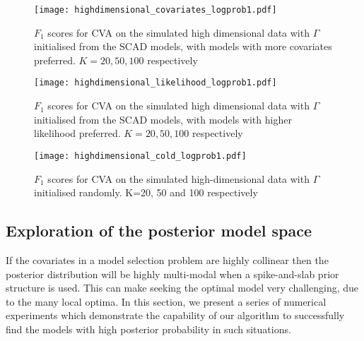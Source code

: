 \begin{figure}\label{fig:highdim_warm_start_covariates}
\caption{$F_1$ scores for CVA on the simulated high dimensional data with $\Gamma$ initialised from the SCAD models, with models with more covariates preferred. $K=20, 50, 100$ respectively}
\texttt{[image: highdimensional\_covariates\_logprob1.pdf]}
\end{figure}

\begin{figure}\label{fig:highdim_warm_start_likelihood}
\caption{$F_1$ scores for CVA on the simulated high dimensional data with $\Gamma$ initialised from the SCAD models, with models with higher likelihood preferred. $K=20, 50, 100$ respectively}
\texttt{[image: highdimensional\_likelihood\_logprob1.pdf]}
\end{figure}

\begin{figure}\label{fig:highdim_cold_start}
\caption{$F_1$ scores for CVA on the simulated high-dimensional data with $\Gamma$ initialised randomly.
					K=20, 50 and 100 respectively}
\texttt{[image: highdimensional\_cold\_logprob1.pdf]}
\end{figure}

\subsection{Exploration of the posterior model space}

If the covariates in a model selection problem are highly collinear then the posterior distribution will be
highly multi-modal when a spike-and-slab prior structure is used. This can make seeking the optimal model very
challenging, due to the many local optima. In this section, we present a series of numerical experiments which
demonstrate the capability of our algorithm to successfully find the models with high posterior probability in
such situations.

